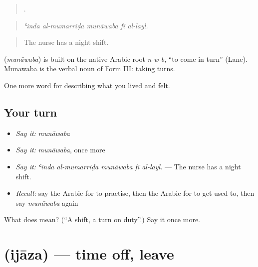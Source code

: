 \begin{quote}
    .
\end{quote}

\begin{quote}
\emph{ʿinda al-mumarriḍa munāwaba fī al-layl.}
\end{quote}

\begin{quote}
The nurse has a night shift.
\end{quote}

\begin{cousinweb}
\textbf{} (\emph{munāwaba}) is built on the native Arabic root \emph{n-w-b}, \textquotedblleft{}to come in turn\textquotedblright{} (Lane). Munāwaba is the verbal noun of Form III: taking turns.
\end{cousinweb}

\begin{grammarlens}[title={What you've built}]
One more word for describing what you lived and felt.
\end{grammarlens}

\subsection*{Your turn}
\begin{itemize}
\raggedright
  \item \emph{Say it:} \emph{munāwaba}
  \item \emph{Say it:} \emph{munāwaba}, once more
  \item \emph{Say it:} \emph{ʿinda al-mumarriḍa munāwaba fī al-layl.} — The nurse has a night shift.
  \item \emph{Recall:} say the Arabic for to practise, then the Arabic for to get used to, then say \emph{munāwaba} again
\end{itemize}

\begin{tcolorbox}[breakable,colback=teal!4,colframe=teal!35!black,title={Before you move on}]
What does  mean? (\textquotedblleft{}A shift, a turn on duty\textquotedblright{}.) Say it once more.
\end{tcolorbox}
\section[\texorpdfstring{\ar{إجازة} (ijāza)}{إجازة (ijāza)}]{ (ijāza) — time off, leave}

\label{lesson:AR-C520-ijaza}



